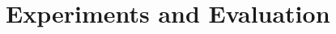 \documentclass{article}
\theoremstyle{plain}
\theoremstyle{definition}
\theoremstyle{remark}
\begin{document}
 





\vspace{-6pt}
\section{Experiments and Evaluation}
\label{sec:results}
\end{document}
